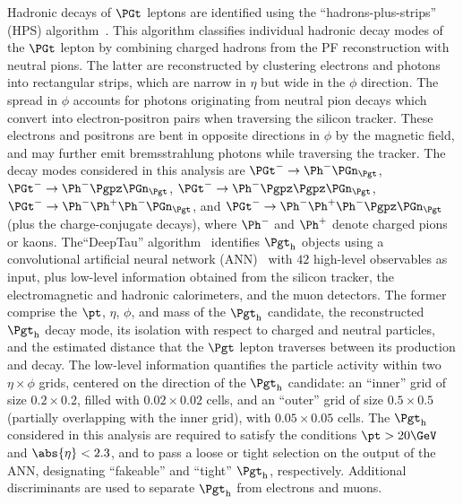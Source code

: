 Hadronic decays of $\PGt$ leptons are identified using the ``hadrons-plus-strips'' (HPS) algorithm~\cite{Sirunyan:2018pgf}.
This algorithm classifies individual hadronic decay modes of the $\PGt$ lepton
by combining charged hadrons from the PF reconstruction with neutral pions.
The latter are reconstructed by clustering electrons and photons into rectangular strips,
which are narrow in $\eta$ but wide in the $\phi$ direction.
The spread in $\phi$ accounts for photons originating from neutral pion decays
which convert into electron-positron pairs when traversing the silicon tracker.
These electrons and positrons are bent in opposite directions in $\phi$ by the magnetic field,
and may further emit bremsstrahlung photons while traversing the tracker.
The decay modes considered in this analysis are
$\PGt^{-} \to \Ph^{-}\Pnut$, $\PGt^{-} \to \Ph^{-}\Ppizero\Pnut$, $\PGt^{-} \to \Ph^{-}\Ppizero\Ppizero\Pnut$, 
$\PGt^{-} \to \Ph^{-}\Ph^{+}\Ph^{-}\Pnut$, and $\PGt^{-} \to \Ph^{-}\Ph^{+}\Ph^{-}\Ppizero\Pnut$
(plus the charge-conjugate decays),
where $\Ph^{-}$ and $\Ph^{+}$ denote charged pions or kaons.
The``DeepTau'' algorithm~\cite{CMS-DP-2019-033} identifies $\tauh$ objects
using a convolutional artificial neural network (ANN)~\cite{lecun1989}
with $42$ high-level observables as input, plus low-level information obtained from the silicon tracker, the electromagnetic and hadronic calorimeters, and the muon detectors.
The former comprise the $\pt$, $\eta$, $\phi$, and mass of the $\tauh$ candidate, the reconstructed $\tauh$ decay mode,
its isolation with respect to charged and neutral particles,
and the estimated distance that the $\Pgt$ lepton traverses between its production and decay.
The low-level information quantifies the particle activity within two $\eta \times \phi$ grids, centered on the direction of the $\tauh$ candidate:
an ``inner'' grid of size $0.2 \times 0.2$, filled with $0.02 \times 0.02$ cells,
and an ``outer'' grid of size $0.5 \times 0.5$ (partially overlapping with the inner grid), with $0.05 \times 0.05$ cells.
The $\tauh$ considered in this analysis are required to satisfy the conditions $\pt > 20\GeV$ and $\abs{\eta} < 2.3$,
and to pass a loose or tight selection on the output of the ANN, designating ``fakeable'' and ``tight'' $\tauh$, respectively.
Additional discriminants are used to separate $\tauh$ from electrons and muons.

